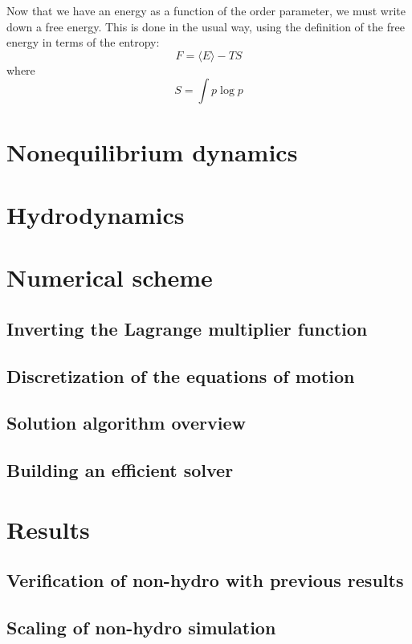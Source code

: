 \documentclass[reqno]{article}
\begin{document}
  Now that we have an energy as a function of the order parameter, we must write
  down a free energy.
  This is done in the usual way, using the definition of the free energy in
  terms of the entropy:
  \begin{equation}
    F = \langle E \rangle - TS
  \end{equation}
  where
  \begin{equation}
    S
    =
    \int p \log p
  \end{equation}

  \section{Nonequilibrium dynamics}

  \section{Hydrodynamics}

  \section{Numerical scheme}
  \subsection{Inverting the Lagrange multiplier function}
  \subsection{Discretization of the equations of motion}
  \subsection{Solution algorithm overview}
  \subsection{Building an efficient solver}

  \section{Results}
  \subsection{Verification of non-hydro with previous results}
  \subsection{Scaling of non-hydro simulation}
\end{document}
